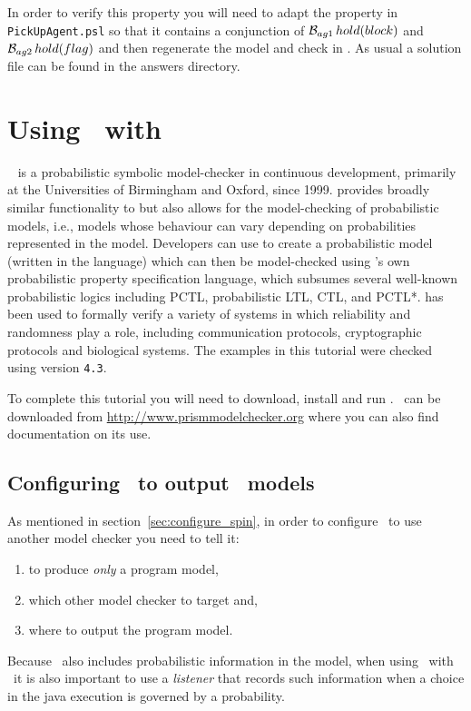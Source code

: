 \begin{sloppypar}
In order to verify this property you will need to adapt the property in \texttt{PickUpAgent.psl} so that it contains a  conjunction of $\mathrm{{\cal B}}_{ag1} \, hold(block)$ and $\mathrm{{\cal B}}_{ag2} \, hold(flag)$ and then regenerate the model and check in \spin.  As usual a solution file can be found in the answers directory.
\end{sloppypar}

\section{Using \ajpf\ with \prism}
\prism{}~\cite{KNP11} is a probabilistic symbolic model-checker in
continuous development, primarily at the Universities of Birmingham
and Oxford, since 1999. \prism{} provides broadly similar
functionality to \spin{} but also allows for the model-checking of
probabilistic models, i.e., models whose behaviour can vary depending
on probabilities represented in the model. Developers can use \prism{} to
create a probabilistic model (written in the \prism{} language) which
can then be model-checked using \prism{}'s own probabilistic property
specification language, which subsumes several well-known
probabilistic logics including PCTL, probabilistic LTL, CTL, and
PCTL*.  \prism{} has been used to formally verify a variety of systems
in which reliability and randomness play a role, including
communication protocols, cryptographic protocols and biological
systems. The examples in this tutorial were checked using \prism{} version
\texttt{4.3}.

To complete this tutorial you will need to download, install and run \prism.  \prism\ can be downloaded from \url{http://www.prismmodelchecker.org} where you can also find documentation on its use.

\subsection{Configuring \ajpf\ to output \prism\ models}

As mentioned in section~\ref{sec:configure_spin}, in order to configure \ajpf\ to use another model checker you need to tell it:
\begin{enumerate}
\item to produce \emph{only} a program model, 
\item which other model checker to target and,
\item where to output the program model.  
\end{enumerate}
Because \prism\ also includes probabilistic information in the model, when using \ajpf\ with \prism\ it is also important to use a \emph{listener} that records such information when a choice in the java execution is governed by a probability.


